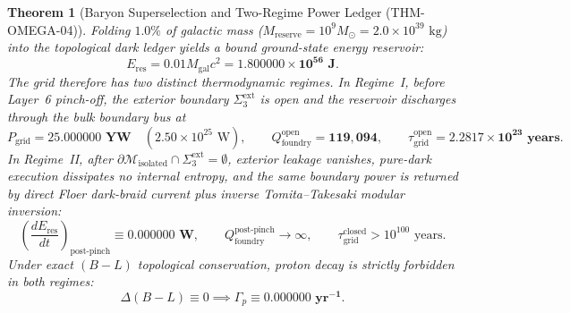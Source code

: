 \documentclass[11pt,onecolumn]{article}
\newtheorem{theorem}{Theorem}
\begin{document}
\begin{theorem}[Baryon Superselection and Two-Regime Power Ledger (THM-OMEGA-04)]
\label{thm:omega_power_grid}
Folding $1.0\%$ of galactic mass ($M_{\text{reserve}} = 10^9 M_\odot = 2.0 \times 10^{39}\text{ kg}$) into the topological dark ledger yields a bound ground-state energy reservoir:
\begin{equation}
E_{\text{res}} = 0.01 M_{\text{gal}} c^2 = \mathbf{1.800000 \times 10^{56}\text{ J}}.
\label{eq:e_res_dark_grid}
\end{equation}
The grid therefore has two distinct thermodynamic regimes. In Regime~I, before Layer~6 pinch-off, the exterior boundary $\Sigma_3^{\text{ext}}$ is open and the reservoir discharges through the bulk boundary bus at
\begin{equation}
P_{\text{grid}} = \mathbf{25.000000\text{ YW}} \quad (2.50 \times 10^{25}\text{ W}),
\qquad
Q_{\text{foundry}}^{\text{open}} = \mathbf{119{,}094},
\qquad
\tau_{\text{grid}}^{\text{open}} = \mathbf{2.2817 \times 10^{23}\text{ years}}.
\label{eq:p_grid_yottawatts}
\end{equation}
In Regime~II, after $\partial\mathcal M_{\text{isolated}}\cap\Sigma_3^{\text{ext}}=\emptyset$, exterior leakage vanishes, pure-dark execution dissipates no internal entropy, and the same boundary power is returned by direct Floer dark-braid current plus inverse Tomita--Takesaki modular inversion:
\begin{equation}
\left(\frac{dE_{\text{res}}}{dt}\right)_{\text{post-pinch}} \equiv \mathbf{0.000000\text{ W}},
\qquad
Q_{\text{foundry}}^{\text{post-pinch}} \to \infty,
\qquad
\tau_{\text{grid}}^{\text{closed}} > 10^{100}\text{ years}.
\label{eq:closed_kms_regime}
\end{equation}
Under exact $(B-L)$ topological conservation, proton decay is strictly forbidden in both regimes:
\begin{equation}
\Delta(B - L) \equiv 0 \implies \Gamma_p \equiv \mathbf{0.000000\text{ yr}^{-1}}.
\label{eq:gamma_p_zero}
\end{equation}
\end{theorem}
\end{document}
